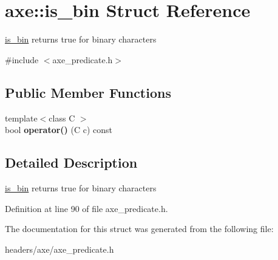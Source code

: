 \hypertarget{structaxe_1_1is__bin}{\section{axe\+:\+:is\+\_\+bin Struct Reference}
\label{structaxe_1_1is__bin}
}


\hyperlink{structaxe_1_1is__bin}{is\+\_\+bin} returns true for binary characters  




{\ttfamily \#include $<$axe\+\_\+predicate.\+h$>$}

\subsection*{Public Member Functions}
\begin{DoxyCompactItemize}
\item 
\hypertarget{structaxe_1_1is__bin_a224ed223a7d6723a2b1ac94685ca0115}{{\footnotesize template$<$class C $>$ }\\bool {\bfseries operator()} (C c) const }\label{structaxe_1_1is__bin_a224ed223a7d6723a2b1ac94685ca0115}

\end{DoxyCompactItemize}


\subsection{Detailed Description}
\hyperlink{structaxe_1_1is__bin}{is\+\_\+bin} returns true for binary characters 

Definition at line 90 of file axe\+\_\+predicate.\+h.



The documentation for this struct was generated from the following file\+:\begin{DoxyCompactItemize}
\item 
headers/axe/axe\+\_\+predicate.\+h\end{DoxyCompactItemize}
